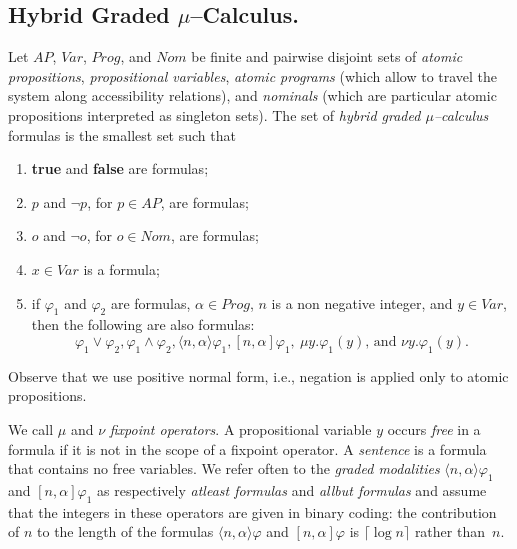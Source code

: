 \documentclass{LMCS}
\theoremstyle{plain}
\newcommand \tpl[1] {\langle #1 \rangle}
\begin{document}
\subsection{Hybrid Graded $\mu$--Calculus.}\label{sub:FullyEnrichedMuCalculus}
Let $\mathit{AP}$, $\mathit{Var}$, $\mathit{Prog}$, and $\mathit{Nom}$ be
finite and pairwise disjoint sets of \emph{atomic propositions},
\emph{propositional variables}, \emph{atomic programs} (which allow to travel
the system along accessibility relations), and \emph{nominals} (which are
particular atomic propositions interpreted as singleton sets). The set of
\emph{hybrid graded $\mu$--calculus} formulas is the smallest set such that
\begin{enumerate}[$\bullet$]
\item
\textbf{true} and \textbf{false} are formulas;

\item
$p$ and $\neg p$, for $p \in AP$, are formulas;

\item
$o$ and $\neg o$, for $o \in \mathit{Nom}$, are formulas;

\item
$x \in \mathit{Var}$ is a formula;

\item
if $\varphi_1$ and $\varphi_2$ are formulas, $\alpha \in Prog$, $n$ is a non
negative integer, and $y \in Var$, then the following are also formulas:
    $$\varphi_1 \vee \varphi_2, \varphi_1 \wedge \varphi_2, \tpl{n,\alpha} \varphi_1,
            [n, \alpha] \varphi_1,~ \mu y. \varphi_1(y)\text{, and } \nu y. \varphi_1(y).$$
\end{enumerate}

Observe that we use positive normal form, i.e., negation is applied only to
atomic propositions.

We call $\mu$ and $\nu$ \emph{fixpoint operators}. A propositional variable $y$
occurs \emph{free} in a formula if it is not in the scope of a fixpoint
operator. A \emph{sentence} is a formula that contains no free variables. We
refer often to the \emph{graded modalities} $\tpl{n, \alpha} \varphi_1$ and
$[n, \alpha] \varphi_1$ as respectively \emph{atleast formulas} and
\emph{allbut formulas} and assume that the integers in these operators are
given in binary coding: the contribution of $n$ to the length of the formulas
$\tpl{n,\alpha}\varphi$ and $[n,\alpha]\varphi$ is $\lceil \log n \rceil$
rather than~$n$.
\end{document}
